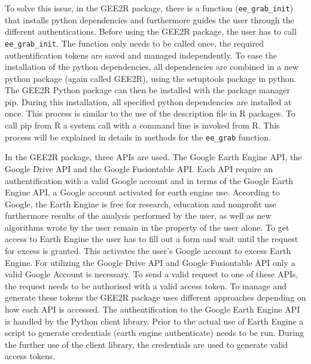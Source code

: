 To solve this issue, in the GEE2R package, there is a function (\texttt{ee\_grab\_init}) that installs python dependencies and furthermore guides the user through the different authentications. Before using the GEE2R package, the user has to call \texttt{ee\_grab\_init}. The function only needs to be called once, the required authentification tokens are saved and managed independently. 
To ease the installation of the python dependencies, all dependencies are combined in a new python package (again called GEE2R), using the setuptools package in python. The GEE2R Python package can then be installed with the package manager pip. During this installation, all specified python dependencies are installed at once. This process is similar to the use of the description file in R packages. To call pip from R a system call with a command line is invoked from R. This process will be explained in details in methods for the \texttt{ee\_grab} function. 

In the GEE2R package, three APIs are used. The Google Earth Engine API, the Google Drive API and the Google Fusiontable API. Each API require an authentification with a valid Google account and in terms of the Google Earth Engine API, a Google account activated for earth engine use. According to Google, the Earth Engine is free for research, education and nonprofit use furthermore results of the analysis performed by the user, as well as new algorithms wrote by the user remain in the property of the user alone.
To get access to Earth Engine the user has to fill out a form and wait until the request for excess is granted. This activates the user's Google account to excess Earth Engine. For utilizing the Google Drive API and Google Fusiontable API only a valid Google Account is necessary. To send a valid request to one of these APIs, the request needs to be authorised with a valid access token. To manage and generate these tokens the GEE2R package uses different approaches depending on how each API is accessed. The authentification to the Google Earth Engine API is handled by the Python client library. Prior to the actual use of Earth Engine a script to generate credentials (earth engine authenticate) needs to be run. During the further use of the client library, the credentials are used to generate valid access tokens.

